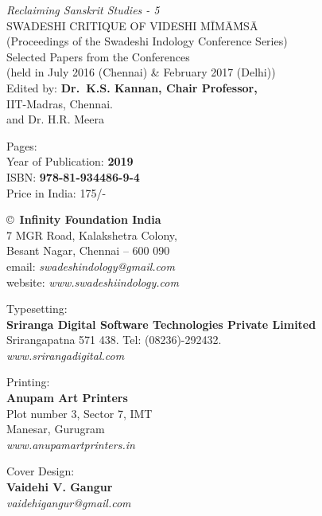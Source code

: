 \thispagestyle{empty}

\noindent
{\fontsize{9}{11}\selectfont\sl Reclaiming Sanskrit Studies - 5}\\
SWADESHI CRITIQUE OF VIDESHI MĪMĀṀSĀ\\
(Proceedings of the Swadeshi Indology Conference Series)\\
Selected Papers from the Conferences\\
(held in July 2016 (Chennai) \& February 2017 (Delhi))\\
Edited by: {\bf Dr.\ K.S. Kannan, Chair Professor,}\\
IIT-Madras, Chennai.\\
and Dr. H.R. Meera
\vfill

\noindent
Pages: {\bf\pageref{bookend}}\\
Year of Publication: {\bf 2019}\\
ISBN: {\bf 978-81-934486-9-4}\\
Price in India: 175/-
\vfill

\noindent
\copyright\ {\bf Infinity Foundation India}\\ 
7 MGR Road, Kalakshetra Colony,\\ 
Besant Nagar, Chennai -- 600 090\\
email: {\sl swadeshindology@gmail.com}\\
website: {\sl www.swadeshiindology.com} 
\vfill

\noindent
Typesetting:\\ 
{\bf Sriranga Digital Software Technologies Private Limited}\\ 
Srirangapatna 571 438. Tel: (08236)-292432.\\
{\sl www.srirangadigital.com}
\vfill

\noindent
Printing:\\
{\bf Anupam Art Printers}\\
Plot number 3, Sector 7, IMT\\
Manesar, Gurugram\\
{\sl www.anupamartprinters.in}
\bigskip

\noindent
Cover Design:\\ 
{\bf Vaidehi V. Gangur}\\
{\sl vaidehigangur@gmail.com}
